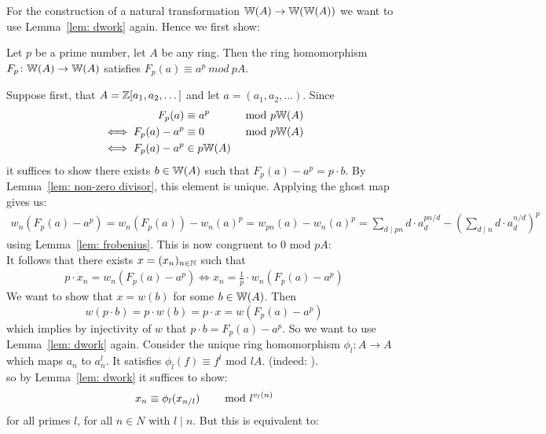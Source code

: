 For the construction of a natural transformation $\mathbb{W}(A) \to \mathbb{W}(\mathbb{W}(A))$
we want to use Lemma~\ref{lem: dwork} again. Hence we first show:
\begin{lemma} \label{lem: frobenius lifts frobenius}
    Let $p$ be a prime number, let $A$ be any ring.
    Then the ring homomorphism $F_p \colon \mathbb{W}(A) \to \mathbb{W}(A)$  
    satisfies $F_p(a) \equiv a^p \ mod \ pA.$
\end{lemma}
\begin{beweis}
    Suppose first, that $A = \mathbb{Z}[a_1,a_2,\dots]$ and let $a = (a_1,a_2,\dots)$. Since
    \begin{align*}
        F_p(a) &\equiv a^p \hskip8mm &\text{mod } p\mathbb{W}(A) \\
        \iff F_p(a)-a^p &\equiv 0 \hskip8mm &\text{mod } p\mathbb{W}(A) \\
        \iff F_p(a) - a^p &\in p\mathbb{W}(A) \\
    \end{align*}
    it suffices to show there exists $b \in \mathbb{W}(A)$ such that $F_p(a)-a^p = p\cdot b$.
    By Lemma~\ref{lem: non-zero divisor}, this element is unique. Applying the ghost map gives us:
    \begin{align*}
        w_n(F_p(a) - a^p) = w_n(F_p(a))-w_n(a)^p = w_{pn}(a) - w_n(a)^p 
        = \sum_{d \mid pn}d \cdot a_d^{pn/d} - ( \sum_{d \mid n} d \cdot a_d^{n/d})^p
    \end{align*}
    using Lemma~\ref{lem: frobenius}. This is now congruent to $0$ mod $pA$:
    \\
    It follows that there exists $x = (x_n)_{n \in \mathbb{N}}$ such that 
    \begin{align}
        \label{eq: p cdot x_n}
        p \cdot x_n = w_n(F_p(a)-a^p)
        \iff x_n = \frac{1}{p} \cdot w_n(F_p(a)-a^p)
    \end{align}
    We want to show that $x = w(b)$ for some $b \in \mathbb{W}(A)$.
    Then 
    \[
        w(p \cdot b) = p \cdot w(b) = p \cdot x = w(F_p(a)-a^p)
    \]
    which implies by injectivity of $w$ that $p \cdot b = F_p(a) -a^p$.
    So we want to use Lemma~\ref{lem: dwork} again.
    Consider the unique ring homomorphism $\phi_l \colon A \to A$ which maps
    $a_n$ to $a_n^l$. It satisfies $\phi_l(f) \equiv f^l$ mod $lA$.
    (indeed: ). \\
    so by Lemma~\ref{lem: dwork} it suffices to show: 
    \[
        x_n \equiv \phi_l(x_{n/l}) \text{\hskip8mm mod }l^{v_l(n)}
    \]
    for all primes $l$, for all $n \in N$ with $l \mid n$.
    But this is equivalent to:

\end{beweis}
